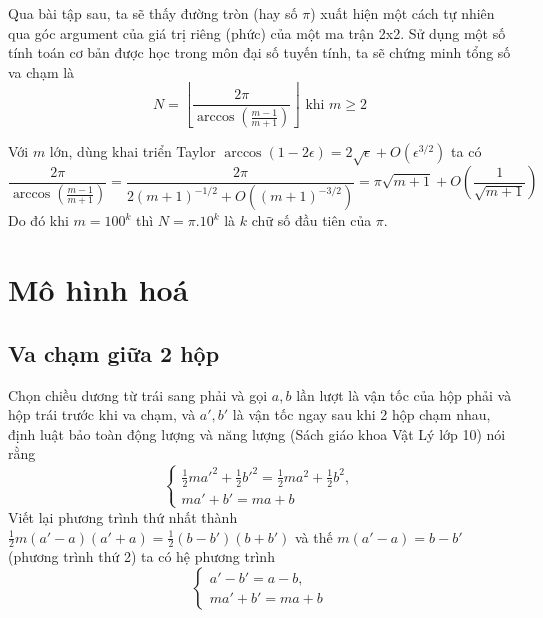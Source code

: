 \documentclass[11pt]{article}
\begin{document}
Qua bài tập
sau, ta sẽ thấy đường tròn (hay số \(\pi\)) xuất hiện một cách tự nhiên qua góc argument của
giá trị riêng (phức) của một ma trận 2x2. Sử dụng một số
tính toán cơ bản được học trong môn đại số tuyến tính, ta sẽ chứng minh tổng số va chạm là
\[
N = \left \lfloor \frac{2\pi}{\arccos(\frac{m-1}{m+1})}\right\rfloor \text{ khi } m\geq 2
\]

Với \(m\) lớn, dùng khai triển Taylor \(\arccos(1 - 2\epsilon) = 2\sqrt{\epsilon} +
O(\epsilon^{3/2})\) ta có 
\[ 
\frac{2\pi}{\arccos(\frac{m-1}{m+1})} = \frac{2\pi}{2(m+1)^{-1/2} + O((m+1)^{-3/2})}=
\pi\sqrt{m+1} + O(\frac{1}{\sqrt{m+1}})  
\]
Do đó khi \(m=100^k\) thì \(N = \pi .10^k\) là \(k\) chữ số đầu tiên của \(\pi\).

\section*{Mô hình hoá}
\label{sec:org93c7835}
\subsection*{Va chạm giữa 2 hộp}
\label{sec:orgf5375ad}

Chọn chiều dương từ trái sang phải và gọi \(a,b\) lần lượt là vận tốc của hộp phải và
hộp trái trước khi va chạm, và \(a', b'\) là vận tốc ngay sau khi 2 hộp chạm nhau, định luật bảo toàn động lượng và
năng lượng (Sách giáo khoa Vật Lý lớp 10) nói rằng
\begin{equation*}
 \begin{cases}
\frac{1}{2}ma'^2 + \frac{1}{2}b'^2 = \frac{1}{2}ma^2 + \frac{1}{2}b^2,  \\
ma' + b' = ma + b
 \end{cases}
\end{equation*}
Viết lại phương trình thứ nhất thành \(\frac{1}{2}m(a' - a)(a'+a) =
\frac{1}{2}(b-b')(b+b')\) và thế \(m(a'-a) = b-b'\) (phương trình thứ 2)
ta có hệ phương trình
\begin{equation}
\label{eq:bb}
 \begin{cases}
a'-b' = a-b,  \\
ma' + b' = ma + b
 \end{cases}
\end{equation}
\end{document}
